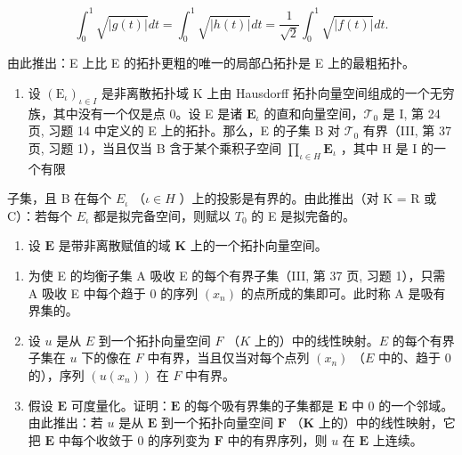 \[
\int_ {0} ^ {1} \sqrt {| g (t) |} d t = \int_ {0} ^ {1} \sqrt {| h (t) |} d t = \frac {1}{\sqrt {2}} \int_ {0} ^ {1} \sqrt {| f (t) |} d t.
\]

由此推出：E 上比 E 的拓扑更粗的唯一的局部凸拓扑是 E 上的最粗拓扑。

\begin{enumerate}
\def\labelenumi{\arabic{enumi})}
\setcounter{enumi}{9}
\tightlist
\item
  设 \((\mathrm{E}_{\iota})_{\iota \in I}\) 是非离散拓扑域 K 上由 Hausdorff 拓扑向量空间组成的一个无穷族，其中没有一个仅是点 0。设 E 是诸 \(\mathbf{E}_{\iota}\) 的直和向量空间，\(\mathcal{T}_0\) 是 I, 第 24 页, 习题 14 中定义的 E 上的拓扑。那么，E 的子集 B 对 \(\mathcal{T}_0\) 有界（III, 第 37 页, 习题 1），当且仅当 B 含于某个乘积子空间 \(\prod_{\iota \in H} \mathbf{E}_{\iota}\) ，其中 H 是 I 的一个有限
\end{enumerate}

子集，且 B 在每个 \(E_{\iota}\) （\(\iota \in H\) ）上的投影是有界的。由此推出（对 K = R 或 C）：若每个 \(E_{\iota}\) 都是拟完备空间，则赋以 \(T_{0}\) 的 E 是拟完备的。

\begin{enumerate}
\def\labelenumi{\arabic{enumi})}
\setcounter{enumi}{10}
\tightlist
\item
  设 \(\mathbf{E}\) 是带非离散赋值的域 \(\mathbf{K}\) 上的一个拓扑向量空间。
\end{enumerate}

\begin{enumerate}
\def\labelenumi{\alph{enumi})}
\item
  为使 E 的均衡子集 A 吸收 E 的每个有界子集（III, 第 37 页, 习题 1），只需 A 吸收 E 中每个趋于 0 的序列 \((x_{n})\) 的点所成的集即可。此时称 A 是吸有界集的。
\item
  设 \(u\) 是从 \(E\) 到一个拓扑向量空间 \(F\) （\(K\) 上的）中的线性映射。\(E\) 的每个有界子集在 \(u\) 下的像在 \(F\) 中有界，当且仅当对每个点列 \((x_{n})\) （\(E\) 中的、趋于 0 的），序列 \((u(x_{n}))\) 在 \(F\) 中有界。
\item
  假设 \(\mathbf{E}\) 可度量化。证明：\(\mathbf{E}\) 的每个吸有界集的子集都是 \(\mathbf{E}\) 中 0 的一个邻域。由此推出：若 \(u\) 是从 \(\mathbf{E}\) 到一个拓扑向量空间 \(\mathbf{F}\) （\(\mathbf{K}\) 上的）中的线性映射，它把 \(\mathbf{E}\) 中每个收敛于 0 的序列变为 \(\mathbf{F}\) 中的有界序列，则 \(u\) 在 \(\mathbf{E}\) 上连续。
\end{enumerate}

